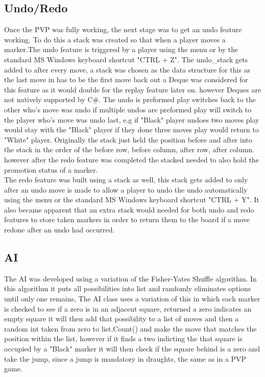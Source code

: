 \documentclass[10pt, a4paper]{article}
\begin{document}
	\subsection{Undo/Redo}
	Once the PVP was fully working, the next stage was to get an undo feature working. To do this a stack was created so that when a player moves a marker.The undo feature is triggered by a player using the menu or by the standard MS Windows keyboard shortcut "CTRL + Z". The undo\_stack gets added to after every move, a stack was chosen as the data structure for this as the last move in has to be the first move back out a Deque was considered for this feature as it would double for the replay feature later on. however Deques are not natively supported by C\#. The undo is preformed play switches back to the other who's move was undo if multiple undos are preformed play will switch to the player who's move was undo last, e.g if "Black" player undoes two moves play would stay with the "Black" player if they done three moves play would return to "White" player. Originally the stack just held the position before and after into the stack in the order of the before row, before column, after row, after column. however after the redo feature was completed the stacked needed to also hold the promotion status of a marker. 
\\
The redo feature was built using a stack as well, this stack gets added to only after an undo move is made to allow a player to undo the undo automatically using the menu or the standard MS Windows keyboard shortcut "CTRL + Y".  It also became apparent that an extra stack would needed for both undo and redo features to store taken markers in order to return them to the board if a move redone after an undo had occurred.
	
	\subsection{AI}
The AI was developed using a variation of the Fisher-Yates Shuffle algorithm. In this algorithm it puts all possibilities into list and randomly eliminates options until only one remains, The AI class uses a variation of this in which each marker is checked to see if a zero is in an adjacent square, returned a zero indicates an empty square it will then add that possibility to a list of moves and then a random int taken from zero to list.Count() and make the move that matches the position within the list, however if it finds a two indicting the that square is occupied by a "Black" marker it will then check if the square behind is a zero and take the jump, since a jump is mandatory in draughts, the same as in a PVP game.
\end{document}

